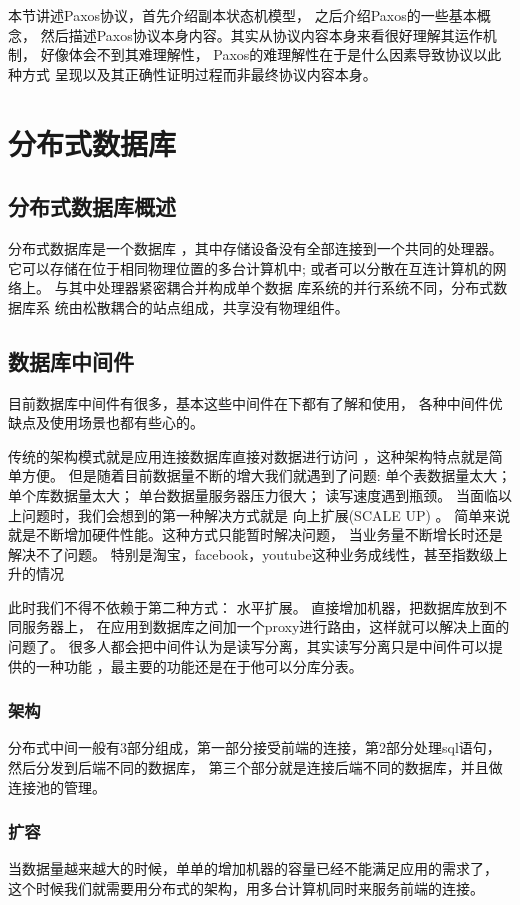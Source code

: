 本节讲述Paxos协议，首先介绍副本状态机模型，
之后介绍Paxos的一些基本概念，
然后描述Paxos协议本身内容。其实从协议内容本身来看很好理解其运作机制，
好像体会不到其难理解性，
Paxos的难理解性在于是什么因素导致协议以此种方式
呈现以及其正确性证明过程而非最终协议内容本身。
\section{分布式数据库}
\subsection{分布式数据库概述}
分布式数据库是一个数据库
，其中存储设备没有全部连接到一个共同的处理器。
它可以存储在位于相同物理位置的多台计算机中; 
或者可以分散在互连计算机的网络上。
与其中处理器紧密耦合并构成单个数据
库系统的并行系统不同，分布式数据库系
统由松散耦合的站点组成，共享没有物理组件。
\subsection{数据库中间件}
目前数据库中间件有很多，基本这些中间件在下都有了解和使用，
各种中间件优缺点及使用场景也都有些心的。

传统的架构模式就是应用连接数据库直接对数据进行访问
，这种架构特点就是简单方便。
但是随着目前数据量不断的增大我们就遇到了问题: 
单个表数据量太大；
单个库数据量太大；
单台数据量服务器压力很大；
读写速度遇到瓶颈。
当面临以上问题时，我们会想到的第一种解决方式就是
向上扩展(SCALE UP) 。
简单来说就是不断增加硬件性能。这种方式只能暂时解决问题，
当业务量不断增长时还是解决不了问题。
特别是淘宝，facebook，youtube这种业务成线性，甚至指数级上升的情况

此时我们不得不依赖于第二种方式：
 水平扩展。 直接增加机器，把数据库放到不同服务器上，
 在应用到数据库之间加一个proxy进行路由，这样就可以解决上面的问题了。
很多人都会把中间件认为是读写分离，其实读写分离只是中间件可以提供的一种功能
，最主要的功能还是在于他可以分库分表。
\subsubsection{架构}
分布式中间一般有3部分组成，第一部分接受前端的连接，第2部分处理sql语句，然后分发到后端不同的数据库，
第三个部分就是连接后端不同的数据库，并且做连接池的管理。
\subsubsection{扩容}
当数据量越来越大的时候，单单的增加机器的容量已经不能满足应用的需求了，
这个时候我们就需要用分布式的架构，用多台计算机同时来服务前端的连接。
